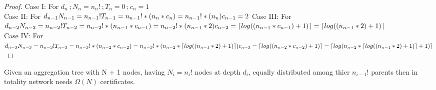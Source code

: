 \begin{proof}
	
	Case I: For $d_{n}\ ; N_{n} = n_{n}!\ ; T_{n} = 0\ ; c_{n} = 1 $\\
	Case II: For $d_{n - 1}\\ N_{n - 1} = n_{n - 1}!\\ T_{n - 1} = n_{n - 1}! * (n_{n} * c_{n}) = n_{n - 1}! * (n_{n} )\\ c_{n - 1} = 2\\ $
	Case III: For $d_{n - 2}\\ N_{n - 2} = n_{n - 2}!\\ T_{n -2} = n_{n - 2}! * (n_{n - 1} * c_{n - 1}) = n_{n - 2}! * (n_{n - 1 } * 2) \\ c_{n - 2} = \lceil log((n_{n - 1} *c_{n - 1}) + 1) \rceil = \lceil log((n_{n - 1} * 2) + 1) \rceil $\\
	Case IV: For $d_{n - 3}\\ N_{n - 3} = n_{n - 3}!\\ T_{n -3} = n_{n - 3}! * (n_{n - 2} * c_{n - 2}) = n_{n - 3}! * (n_{n - 2 } * \lceil log((n_{n - 1} * 2 ) + 1) \rceil ) \\ c_{n - 3} = \lceil log((n_{n - 2} * c_{n - 2}) + 1) \rceil = \lceil log( n_{n - 2} *\lceil log((n_{n - 1} * 2 ) + 1) \rceil + 1) \rceil $\\
\end{proof}

\begin{theorem}
		Given an aggregation tree with N + 1 nodes, having $N_{i} = n_{i}!$ nodes at depth $d_{i}$, equally distributed among thier $n_{i-1}!$ parents then in totality network needs $\Omega(N)$ certificates.
\end{theorem}

